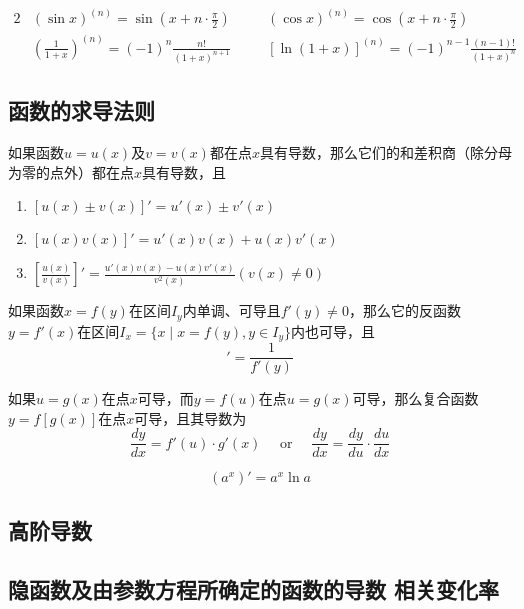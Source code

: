 \documentclass[11pt]{article}
\begin{document}
\begin{alignat*}{2}
&(\sin x)^{(n)} = \sin(x+n\cdot\frac{\pi}{2})&&
(\cos x)^{(n)} = \cos(x+n\cdot\frac{\pi}{2})\\
&(\frac{1}{1+x})^{(n)} = (-1)^n\frac{n!}{(1+x)^{n+1}}\quad&&
[\ln(1+x)]^{(n)}=(-1)^{n-1}\frac{(n-1)!}{(1+x)^n}
\end{alignat*}
\subsection{函数的求导法则}
\label{sec:orgb85d979}
\begin{theorem}[]
如果函数\(u=u(x)\)及\(v=v(x)\)都在点\(x\)具有导数，那么它们的和差积商（除分母
为零的点外）都在点\(x\)具有导数，且
\begin{enumerate}
\item \([u(x)\pm v(x)]'=u'(x)\pm v'(x)\)
\item \([u(x)v(x)]'=u'(x)v(x)+u(x)v'(x)\)
\item \([\frac{u(x)}{v(x)}]'=\frac{u'(x)v(x)-u(x)v'(x)}{v^2(x)}(v(x)\neq0)\)
\end{enumerate}
\end{theorem}

\begin{theorem}[]
如果函数\(x=f(y)\)在区间\(I_y\)内单调、可导且\(f'(y)\neq0\)，那么它的反函数
\(y=f'(x)\)在区间\(I_x=\{x\mid x=f(y),y\in I_y\}\)内也可导，且
\begin{equation*}
[f^{-1}(x)]'=\frac{1}{f'(y)}
\end{equation*}
\end{theorem}

\begin{theorem}[]
如果\(u=g(x)\)在点\(x\)可导，而\(y=f(u)\)在点\(u=g(x)\)可导，那么复合函数
\(y=f[g(x)]\)在点\(x\)可导，且其导数为
\begin{equation*}
\frac{dy}{dx}=f'(u)\cdot g'(x) \quad\text{ or }\quad
\frac{dy}{dx}=\frac{dy}{du}\cdot\frac{du}{dx}
\end{equation*}
\end{theorem}

\begin{equation*}
(a^x)'=a^x\ln a
\end{equation*}
\subsection{高阶导数}
\label{sec:orgab1321a}
\subsection{隐函数及由参数方程所确定的函数的导数 相关变化率}
\label{sec:orgfb68897}
\end{document}
